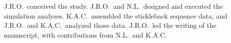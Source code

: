J.R.O.\ conceived the study.
J.R.O.\ and N.L.\ designed and executed the simulation analyses.
K.A.C.\ assembled the stickleback sequence data, and
J.R.O.\ and K.A.C.\ analyzed those data.
J.R.O.\ led the writing of the manuscript, with contributions from N.L.\ and
K.A.C.
